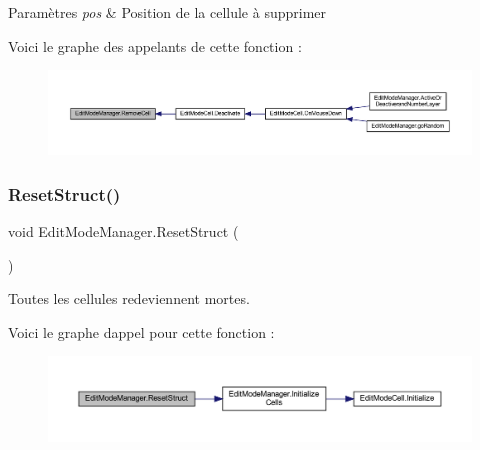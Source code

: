 \begin{DoxyParams}{Paramètres}
{\em pos} & Position de la cellule à supprimer\\
\hline
\end{DoxyParams}
Voici le graphe des appelants de cette fonction \+:
\nopagebreak
\begin{figure}[H]
\begin{center}
\leavevmode
\includegraphics[width=350pt]{class_edit_mode_manager_a8a8c1a3a9558fbbcfa7c15d8ce48a264_icgraph}
\end{center}
\end{figure}
\mbox{\label{class_edit_mode_manager_afc8be75da1a5042fcf78b0e9bf1e2108}} 
\subsubsection{\texorpdfstring{Reset\+Struct()}{ResetStruct()}}
{\footnotesize\ttfamily void Edit\+Mode\+Manager.\+Reset\+Struct (\begin{DoxyParamCaption}{ }\end{DoxyParamCaption})\hspace{0.3cm}{\ttfamily [inline]}}



Toutes les cellules redeviennent mortes. 

Voici le graphe d\textquotesingle{}appel pour cette fonction \+:
\nopagebreak
\begin{figure}[H]
\begin{center}
\leavevmode
\includegraphics[width=350pt]{class_edit_mode_manager_afc8be75da1a5042fcf78b0e9bf1e2108_cgraph}
\end{center}
\end{figure}
\mbox{\label{class_edit_mode_manager_acf80baac30f6611bcb1bf97b61ffc1ca}} 
